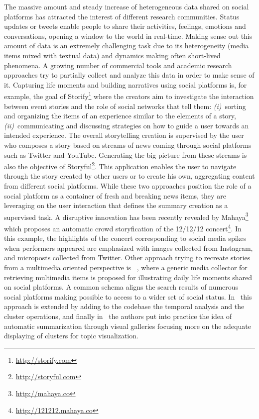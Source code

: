 \documentclass{sig-alternate}
\begin{document}
The massive amount and steady increase of heterogeneous data shared on social platforms has attracted the interest of different research communities. Status updates or tweets enable people to share their activities, feelings, emotions and conversations, opening a window to the world in real-time. Making sense out this amount of data is an extremely challenging task due to its heterogeneity (media items mixed with textual data) and dynamics making often short-lived phenomena. A growing number of commercial tools and academic research approaches try to partially collect and analyze this data in order to make sense of it. Capturing life moments and building narratives using social platforms is, for example, the goal of Storify\footnote{\url{http://storify.com}} where the creators aim to investigate the interaction between event stories and the role of social networks that tell them: \textit{(i)}~sorting and organizing the items of an experience similar to the elements of a story, \textit{(ii)}~communicating and discussing strategies on how to guide a user towards an intended experience. The overall storytelling creation is supervised by the user who composes a story based on streams of news coming through social platforms such as Twitter and YouTube. Generating the big picture from these streams is also the objective of Storyful\footnote{\url{http://storyful.com}}. This application enables the user to navigate through the story created by other users or to create his own, aggregating content from different social platforms. While these two approaches position the role of a social platform as a container of fresh and breaking news items, they are leveraging on the user interaction that defines the summary creation as a supervised task. A disruptive innovation has been recently revealed by Mahaya\footnote{\url{http://mahaya.co}} which proposes an automatic crowd storyfication of the 12/12/12 concert\footnote{\url{http://121212.mahaya.co}}. In this example, the highlights of the concert corresponding to social media spikes when performers appeared are emphasized with images collected from Instagram, and microposts collected from Twitter. Other approach trying to recreate stories from a multimedia oriented perspective is ~\cite{Rizzo2012}, where a generic media collector for retrieving multimedia items is proposed for illustrating daily life moments shared on social platforms. A common schema aligns the search results of numerous social platforms making possible to access to a wider set of social status. In~\cite{Milicic2013} this approach is extended by adding to the codebase the temporal analysis and the cluster operations, and finally in~\cite{Milicic2013b} the authors put into practice the idea of automatic summarization through visual galleries focusing more on the adequate displaying of clusters for topic visualization. 
\end{document}
